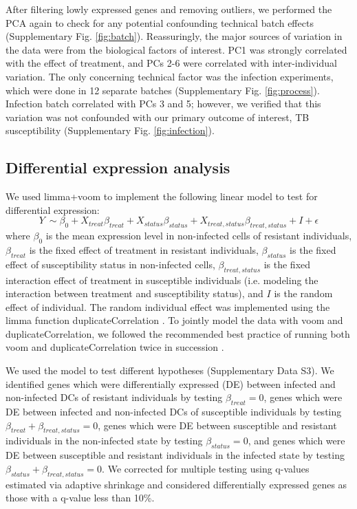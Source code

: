 \documentclass[fleqn,10pt]{wlscirep}
\begin{document}
After filtering lowly expressed genes and removing outliers, we
performed the PCA again to check for any potential confounding
technical batch effects (Supplementary Fig. \ref{fig:batch}).
Reassuringly, the major sources of variation in the data were from the
biological factors of interest. PC1 was strongly correlated with the
effect of treatment, and PCs 2-6 were correlated with inter-individual
variation. The only concerning technical factor was the infection
experiments, which were done in 12 separate batches (Supplementary
Fig. \ref{fig:process}). Infection batch correlated with PCs 3 and 5;
however, we verified that this variation was not confounded with our
primary outcome of interest, TB susceptibility (Supplementary Fig.
\ref{fig:infection}).
\subsection*{Differential expression analysis}

We used limma+voom \cite{Smyth2004, Law2014, Ritchie2015} to implement
the following linear model to test for differential expression:
\begin{equation} \label{eq:limma}
Y\ \sim \beta_{0} + X_{treat}\beta_{treat} + X_{status}\beta_{status} + X_{treat,status}\beta_{treat,status} + I + \epsilon
\end{equation}
where $\beta_{0}$ is the mean expression level in non-infected cells
of resistant individuals, $\beta_{treat}$ is the fixed effect of
treatment in resistant individuals, $\beta_{status}$ is the fixed
effect of susceptibility status in non-infected cells,
$\beta_{treat,status}$ is the fixed interaction effect of treatment in
susceptible individuals (i.e. modeling the interaction between
treatment and susceptibility status), and $I$ is the random effect of
individual. The random individual effect was implemented using the
limma function duplicateCorrelation \cite{Smyth2005}. To jointly model
the data with voom and duplicateCorrelation, we followed the
recommended best practice of running both voom and
duplicateCorrelation twice in succession \cite{Liu2015}.

We used the model to test different hypotheses (Supplementary Data
S3). We identified genes which were differentially expressed (DE)
between infected and non-infected DCs of resistant individuals by
testing $\beta_{treat} = 0$, genes which were DE between infected and
non-infected DCs of susceptible individuals by testing $\beta_{treat}
+ \beta_{treat,status} = 0$, genes which were DE between susceptible
and resistant individuals in the non-infected state by testing
$\beta_{status} = 0$, and genes which were DE between susceptible and
resistant individuals in the infected state by testing $\beta_{status}
+ \beta_{treat,status} = 0$. We corrected for multiple testing using
q-values estimated via adaptive shrinkage \cite{Stephens2016} and
considered differentially expressed genes as those with a q-value less
than 10\%.
\end{document}
